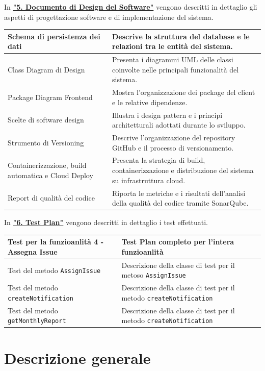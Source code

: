 \documentclass[a4paper,12pt]{article}
\begin{document}
In \hyperref[sec:designSoftware]{\textbf{"5. Documento di Design del Software"}} vengono descritti in dettaglio gli aspetti di progettazione software e di implementazione del sistema. 
\begin{longtable}{|p{5cm}|p{9cm}|} 
\hline 
Schema di persistenza dei dati & Descrive la struttura del database e le relazioni tra le entità del sistema. \\ \hline 
Class Diagram di Design & Presenta i diagrammi UML delle classi coinvolte nelle principali funzionalità del sistema. \\ \hline 
Package Diagram Frontend & Mostra l'organizzazione dei package del client e le relative dipendenze. \\ \hline 
Scelte di software design & Illustra i design pattern e i principi architetturali adottati durante lo sviluppo. \\ \hline 
Strumento di Versioning & Descrive l'organizzazione del repository GitHub e il processo di versionamento. \\ \hline 
Containerizzazione, build automatica e Cloud Deploy & Presenta la strategia di build, containerizzazione e distribuzione del sistema su infrastruttura cloud. \\ \hline 
Report di qualità del codice & Riporta le metriche e i risultati dell'analisi della qualità del codice tramite SonarQube. \\ \hline 
\end{longtable}

In \hyperref[sec:testPlan]{\textbf{"6. Test Plan"}} vengono descritti in dettaglio i test effettuati.
\begin{longtable}{|p{5cm}|p{9cm}|} 
\hline 
Test per la funzioanlità 4 - Assegna Issue & Test Plan completo per l'intera funzioanlità \\ \hline 
Test del metodo \texttt{AssignIssue} & Descrizione della classe di test per il metoso \texttt{AssignIssue} \\ \hline 
Test del metodo \texttt{createNotification} & Descrizione della classe di test per il metodo \texttt{createNotification} \\ \hline 
Test del metodo \texttt{getMonthlyReport} & Descrizione della classe di test per il metodo \texttt{createNotification} \\ \hline 
\end{longtable}

\newpage
\label{sec:descrizioneGenerale}
\section{Descrizione generale}
\end{document}
